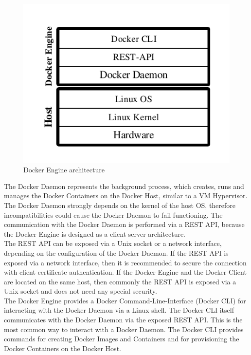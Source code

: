 \begin{figure}[htbp]
	\centering
	\includegraphics[scale=1]{images/docker-engine.pdf}
	\caption{Docker Engine architecture}
	\label{fig:docker-engine}
\end{figure} 

\label{sec:docker-daemon}
The Docker Daemon represents the background process, which creates, runs and manages the Docker Containers on the Docker Host, similar to a VM Hypervisor. The Docker Daemon strongly depends on the kernel of the host OS, therefore incompatibilities could cause the Docker Daemon to fail functioning. The communication with the Docker Daemon is performed via a REST API, because the Docker Engine is designed as a client server architecture. \\

\label{sec:docker-rest-api}
The REST API can be exposed via a Unix socket or a network interface, depending on the configuration of the Docker Daemon. If the REST API is exposed via a network interface, then it is recommended to secure the connection with client certificate authentication. If the Docker Engine and the Docker Client are located on the same host, then commonly the REST API is exposed via a Unix socket and does not need any special security. \\

\label{sec:docker-cli}
The Docker Engine provides a Docker Command-Line-Interface (Docker CLI) for interacting with the Docker Daemon via a Linux shell. The Docker CLI itself communicates with the Docker Daemon via the exposed REST API. This is the most common way to interact with a Docker Daemon. The Docker CLI provides commands for creating Docker Images and Containers and for provisioning the Docker Containers on the Docker Host. \\

